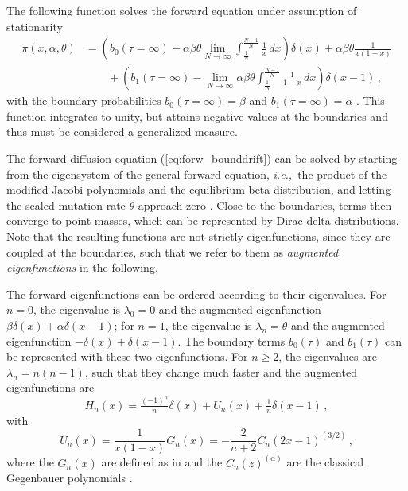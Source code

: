 \documentclass[preprint]{elsarticle}
\newcommand\ie{{\it i.e.,}}
\begin{document}
The following function solves the forward equation under assumption of stationarity
\begin{equation}
\begin{split}
    \pi(x, \alpha, \theta)&=\left(b_0(\tau=\infty)-\alpha\beta\theta \lim_{N\to\infty}\int_{\tfrac1N}^{\tfrac{N-1}N} \frac1x\,dx\right)\delta(x)+\alpha\beta\theta\frac{1}{x(1-x)} \\
    &\qquad+\left(b_1(\tau=\infty)-\lim_{N\to\infty}\alpha\beta\theta \int_{\tfrac1N}^{\tfrac{N-1}N} \frac1{1-x}\,dx\right)\delta(x-1)\,,
\end{split}
\end{equation}
with the boundary probabilities $b_0(\tau=\infty)=\beta$ and $b_1(\tau=\infty)=\alpha$ \citep{Vogl15,Vogl16}. This function integrates to unity, but attains negative values at the boundaries and thus must be considered a generalized measure. 

The forward diffusion equation (\ref{eq:forw_bounddrift}) can be solved by starting from the eigensystem of the general forward equation, \ie\ the product of the modified Jacobi polynomials \citep{Song12} and the equilibrium beta distribution, and letting the scaled mutation rate $\theta$ approach zero \citep[][Appendix A.1]{Vogl15}. Close to the boundaries, terms then converge to point masses, which can be represented by Dirac delta distributions. Note that the resulting functions are not strictly eigenfunctions, since they are coupled at the boundaries, such that we refer to them as \textit{augmented eigenfunctions} in the following. 

The forward eigenfunctions can be ordered according to their eigenvalues. For $n=0$, the eigenvalue is $\lambda_0=0$ and the augmented eigenfunction $\beta\delta(x)+\alpha\delta(x-1)$; for $n=1$, the eigenvalue is $\lambda_n=\theta$ and the augmented eigenfunction $-\delta(x)+\delta(x-1)$. The boundary terms $b_0(\tau)$ and $b_1(\tau)$ can be represented with these two eigenfunctions. For $n\geq 2$, the eigenvalues are $\lambda_n=n(n-1)$, such that they change much faster and the augmented eigenfunctions are \begin{equation}\label{eq:forw_eigen}
    H_n(x)=\tfrac{(-1)^n}{n}\delta(x)+U_n(x)+\tfrac{1}{n}\delta(x-1)\,,
\end{equation}
with 
\begin{equation}
    U_n(x)=\frac1{x(1-x)}G_n(x)=-\frac2{n+2}C_n(2x-1)^{(3/2)}\,,
\end{equation}
where the $G_n(x)$ are defined as in \citet{Song12} and the $C_n(z)^{(\alpha)}$ are the classical Gegenbauer polynomials \citep{Abra70}.
\end{document}
